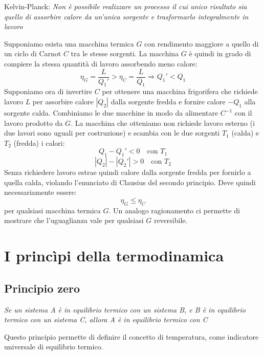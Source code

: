 \documentclass{article}
\begin{document}
\begin{center}
    Kelvin-Planck: \textit{Non è possibile realizzare un processo il cui unico risultato sia quello di assorbire calore da un'unica sorgente e trasformarlo integralmente in lavoro}
\end{center}
Supponiamo esista una macchina termica $G$ con rendimento maggiore a quello di un ciclo di Carnot $C$ tra le stesse sorgenti. La macchina $G$ è quindi in grado di compiere la stessa quantità di lavoro assorbendo meno calore:
$$ \eta_G=\frac{L}{Q_1'}>\eta_C=\frac{L}{Q_1} \Rightarrow Q_1'<Q_1$$
Supponiamo ora di invertire $C$ per ottenere una macchina frigorifera che richiede lavoro $L$ per assorbire calore $|Q_2|$ dalla sorgente fredda e fornire calore $-Q_1$ alla sorgente calda. Combiniamo le due macchine in modo da alimentare $C^{-1}$ con il lavoro prodotto da $G$. La macchina che otteniamo non richiede lavoro esterno (i due lavori sono uguali per costruzione) e scambia con le due sorgenti $T_1$ (calda) e $T_2$ (fredda) i calori:
$$ Q_1 - Q_1' < 0 \quad\text{con $T_1$} $$
$$ |Q_2|-|Q_2'| > 0 \quad\text{con $T_2$} $$
Senza richiedere lavoro estrae quindi calore dalla sorgente fredda per fornirlo a quella calda, violando l'enunciato di Clausius del secondo principio. Deve quindi necessariamente essere:
$$  \eta_G\leq\eta_C $$
per qualsiasi macchina termica $G$. Un analogo ragionamento ci permette di mostrare che l'uguaglianza vale per qualsiasi $G$ reversibile.


\newpage
\section{I princìpi della termodinamica}

\subsection{Principio zero}
\begin{center}
    \textit{Se un sistema A è in equilibrio termico con un sistema B, e B è in equilibrio termico con un sistema C, allora A è in equilibrio termico con C}
\end{center}
Questo principio permette di definire il concetto di temperatura, come indicatore universale di equilibrio termico.
\end{document}
